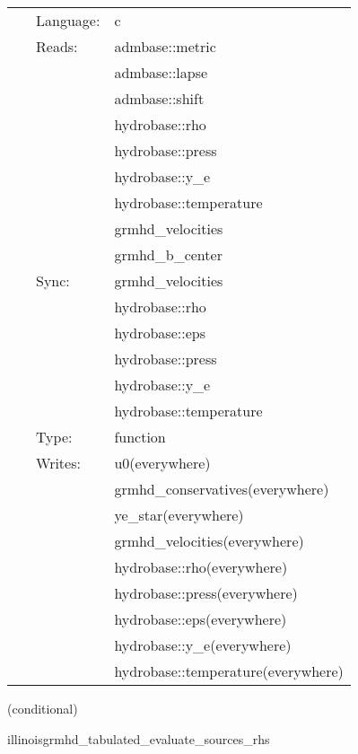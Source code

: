 \documentclass{article}
\begin{document}
 \begin{tabular*}{160mm}{cll} 
~ & Language:  & c \\ 
~ & Reads:  & admbase::metric \\ 
~& ~ &admbase::lapse\\ 
~& ~ &admbase::shift\\ 
~& ~ &hydrobase::rho\\ 
~& ~ &hydrobase::press\\ 
~& ~ &hydrobase::y\_e\\ 
~& ~ &hydrobase::temperature\\ 
~& ~ &grmhd\_velocities\\ 
~& ~ &grmhd\_b\_center\\ 
~ & Sync:  & grmhd\_velocities \\ 
~& ~ &hydrobase::rho\\ 
~& ~ &hydrobase::eps\\ 
~& ~ &hydrobase::press\\ 
~& ~ &hydrobase::y\_e\\ 
~& ~ &hydrobase::temperature\\ 
~ & Type:  & function \\ 
~ & Writes:  & u0(everywhere) \\ 
~& ~ &grmhd\_conservatives(everywhere)\\ 
~& ~ &ye\_star(everywhere)\\ 
~& ~ &grmhd\_velocities(everywhere)\\ 
~& ~ &hydrobase::rho(everywhere)\\ 
~& ~ &hydrobase::press(everywhere)\\ 
~& ~ &hydrobase::eps(everywhere)\\ 
~& ~ &hydrobase::y\_e(everywhere)\\ 
~& ~ &hydrobase::temperature(everywhere)\\ 
\end{tabular*} 


\vspace{5mm}

   (conditional) 

\hspace{5mm} illinoisgrmhd\_tabulated\_evaluate\_sources\_rhs 

\hspace{5mm}{\it tabulated version of illinoisgrmhd\_evaluate\_sources\_rhs } 


\hspace{5mm}
\end{document}
